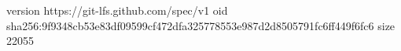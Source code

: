 version https://git-lfs.github.com/spec/v1
oid sha256:9f9348cb53e83df09599cf472dfa325778553e987d2d8505791fc6ff449f6fc6
size 22055
